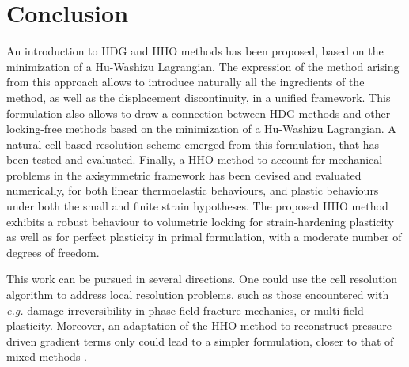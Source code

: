
\section{Conclusion}


An introduction to HDG and HHO methods has been proposed, based on the minimization of a Hu-Washizu Lagrangian. The expression of the method arising from this approach allows to introduce naturally all the ingredients of the method, as well as the displacement discontinuity, in a unified framework.
This formulation also allows to draw a connection between HDG methods and other locking-free methods based on the minimization of a Hu-Washizu Lagrangian.
A natural cell-based resolution scheme emerged from this formulation, that has been tested and evaluated.
Finally, a HHO method to account for mechanical problems in the axisymmetric framework has been devised and evaluated numerically, for both linear thermoelastic behaviours, and plastic behaviours under both the small and finite strain hypotheses.
The proposed HHO method exhibits a robust behaviour to volumetric locking for strain-hardening plasticity as well as for perfect plasticity in primal formulation, with a moderate number of degrees of freedom.

This work can be pursued in several directions. One could use the cell resolution algorithm to address local resolution problems, such as those encountered with \textit{e.g.} damage irreversibility in phase field fracture mechanics, or multi field plasticity. Moreover, an adaptation of the HHO method to
reconstruct pressure-driven gradient terms only could lead to a simpler formulation, closer to that of mixed methods \cite{simo_quasi-incompressible_1991}.